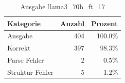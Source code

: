 
\begin{table}[!ht]
\centering
\begin{tabular}{lrr}
\toprule
\textbf{Kategorie} & \textbf{Anzahl} & \textbf{Prozent} \\
\midrule
Ausgabe & 404 & 100.0\% \\
Korrekt & 397 & 98.3\% \\
Parse Fehler & 2 & 0.5\% \\
Struktur Fehler & 5 & 1.2\% \\
\bottomrule
\end{tabular}
\caption{Ausgabe llama3_70b_ft_17}
\label{tab:file_counts}
\end{table}
    